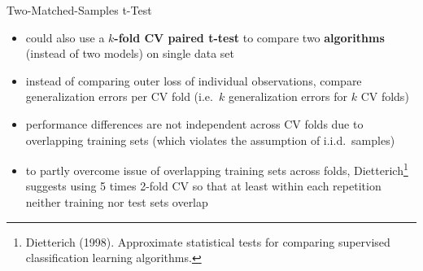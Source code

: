 \begin{frame}[c,allowframebreaks]{Two-Matched-Samples t-Test}
    \begin{itemize}
    \item could also use a \textbf{$k$-fold CV paired t-test} to compare two \textbf{algorithms} (instead of two models) on single data set
    \item instead of comparing outer loss of individual observations, compare
        generalization errors per CV fold (i.e.\ $k$ generalization errors for
        $k$ CV folds)
    \item performance differences are not independent across CV folds due to
        overlapping training sets (which violates the assumption of i.i.d.\
        samples)
    \item to partly overcome issue of overlapping training sets across folds, Dietterich\footnote{Dietterich (1998). Approximate statistical tests for comparing supervised classification learning algorithms.} suggests using 5 times 2-fold CV so that at least within each repetition neither training nor test sets overlap
    \end{itemize}
    \end{frame}


